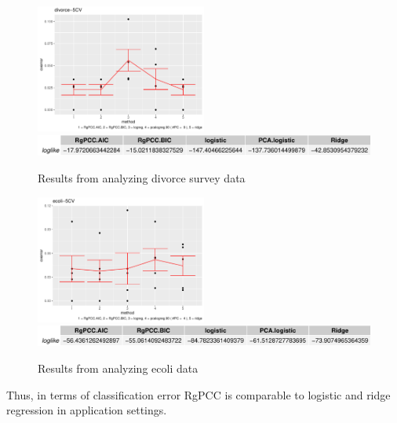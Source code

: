 \documentclass[main.tex]{subfiles}
\begin{document}
\begin{figure}[H]
	\centering
	
	\includegraphics[width = 0.5\textwidth]{R-code/data/divorce-5CVgraph.pdf}
	\includegraphics[width = \textwidth]{R-code/data/divorce-5CVloglike.pdf}
	\label{fig:divorce}
	\caption{Results from analyzing divorce survey data}
\end{figure}

\begin{figure}[H]
	\centering
	
	\includegraphics[width = 0.5\textwidth]{R-code/data/ecoli-5CVgraph.pdf}
	\includegraphics[width = \textwidth]{R-code/data/ecoli-5CVloglike.pdf}
	\label{fig:ecoli}
	\caption{Results from analyzing ecoli data}
\end{figure}

Thus, in terms of classification error RgPCC is comparable to logistic and ridge regression in application settings.
\end{document}
